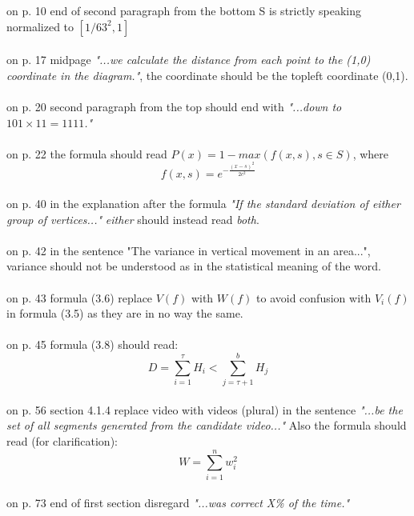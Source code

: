 \documentclass[12pt]{report}
\begin{document}
%
\noindent
on p. 10 end of second paragraph from the bottom S is strictly speaking normalized to $[1/63^2,1]$
\\\\
on p. 17 midpage \textit{"...we calculate the distance from each point to the (1,0) coordinate in the diagram."}, the coordinate should be the topleft coordinate (0,1).
\\\\
on p. 20 second paragraph from the top should end with \textit{"...down to $101 \times 11 = 1111$."}
\\\\
on p. 22 the formula should read $P(x) = 1 - max(f(x,s), s \in S)$, where 
\[
f(x,s)=e^{-\frac{(x-s)^{2}}{2c^{2}}}
\]
\\
on p. 40 in the explanation after the formula \textit{"If the standard deviation of either group of vertices..."} \textit{either} should instead read \textit{both}.
\\\\
on p. 42 in the sentence "The variance in vertical movement in an area...", variance should not be understood as in the statistical meaning of the word.
\\\\
on p. 43 formula (3.6) replace $V(f)$ with $W(f)$ to avoid confusion with $V_i(f)$ in formula (3.5) as they are in no way the same.
\\\\
on p. 45 formula (3.8) should read:
\[
D=\sum_{i=1}^{\tau}H_i < \sum_{j=\tau+1}^{b}H_j
\]
\\
on p. 56 section 4.1.4 replace video with videos (plural) in the sentence \textit{"...be the set of all segments generated from the candidate video..."}
Also the formula should read (for clarification):
\[
W = \sum_{i=1}^n w_i^2
\]
\\
on p. 73 end of first section disregard \textit{"...was correct X\% of the time."}
%
\end{document}
